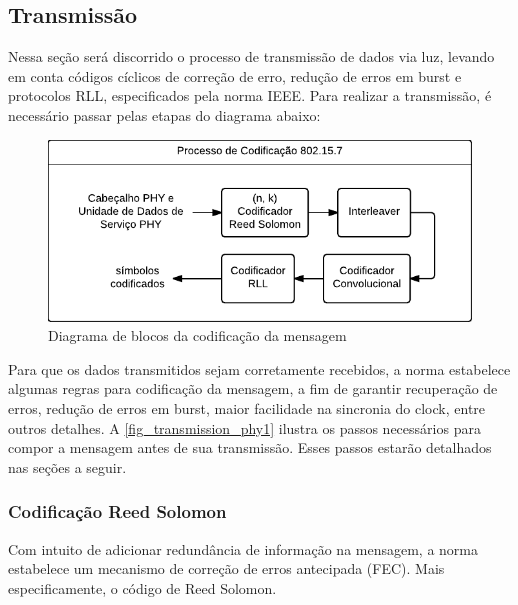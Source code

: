 
	\subsection{Transmissão}
	
	Nessa seção será discorrido o processo de transmissão de dados via luz, levando em conta códigos cíclicos de correção de erro, redução de erros em burst e protocolos RLL, especificados pela norma IEEE. Para realizar a transmissão, é necessário passar pelas etapas do diagrama abaixo:
		
		\begin{figure}[htb]
			\caption{\label{fig_transmission_phy1} Diagrama de blocos da codificação da mensagem}
			\centering
			\includegraphics[width=0.4\textheight]{PHY1-transmission.pdf}
		\end{figure}
		
	Para que os dados transmitidos sejam corretamente recebidos, a norma estabelece algumas regras para codificação da mensagem, a fim de garantir recuperação de erros, redução de erros em burst, maior facilidade na sincronia do clock, entre outros detalhes. A \autoref{fig_transmission_phy1} ilustra os passos necessários para compor a mensagem antes de sua transmissão. Esses passos estarão detalhados nas seções a seguir.
	
	
	\subsubsection{Codificação Reed Solomon}
	
	Com intuito de adicionar redundância de informação na mensagem, a norma estabelece um mecanismo de correção de erros antecipada (FEC). Mais especificamente, o código de Reed Solomon. 
	
